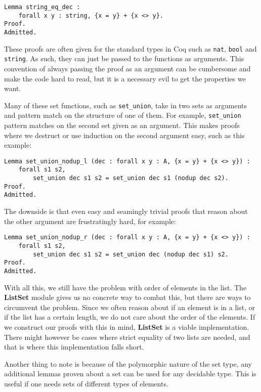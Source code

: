 \begin{lstlisting}[language=Coq, label=lst:string_eq_dec]
Lemma string_eq_dec :
    forall x y : string, {x = y} + {x <> y}.
Proof.
Admitted.
\end{lstlisting}

These proofs are often given for the standard types in Coq such as \lstinline[language=Coq]{nat},
\lstinline[language=Coq]{bool} and \lstinline[language=Coq]{string}.
As such, they can just be passed to the functions as arguments.
This convention of always passing the proof as an argument can be cumbersome and make the code hard to read,
but it is a necessary evil to get the properties we want.

Many of these set functions, such as \lstinline[language=Coq]{set_union},
take in two sets as arguments and pattern match on the structure of one of them.
For example, \lstinline[language=Coq]{set_union} pattern matches on the second set given as an argument.
This makes proofs where we destruct or use induction on the second argument easy, such as this example:
\begin{lstlisting}[language=Coq, label=lst:set_union_nodup_l]
Lemma set_union_nodup_l (dec : forall x y : A, {x = y} + {x <> y}) :
    forall s1 s2,
        set_union dec s1 s2 = set_union dec s1 (nodup dec s2).
Proof.
Admitted.
\end{lstlisting}

The downside is that even easy and seamingly trivial proofs that reason about the other argument are frustratingly hard,
for example:

\begin{lstlisting}[language=Coq, label=lst:set_union_nodup_r]
Lemma set_union_nodup_r (dec : forall x y : A, {x = y} + {x <> y}) :
    forall s1 s2,
        set_union dec s1 s2 = set_union dec (nodup dec s1) s2.
Proof.
Admitted.
\end{lstlisting}

With all this, we still have the problem with order of elements in the list.
The \textbf{ListSet} module gives us no concrete way to combat this, but there are ways to circumvent the problem.
Since we often reason about if an element is in a list, or if the list has a certain length,
we do not care about the order of the elements.
If we construct our proofs with this in mind, \textbf{ListSet} is a viable implementation.
There might however be cases where strict equality of two lists are needed, and that is where this implementation falls short.

Another thing to note is because of the polymorphic nature of the set type, any additional lemmas proven about a set can be
used for any decidable type. This is useful if one needs sets of different types of elements.

